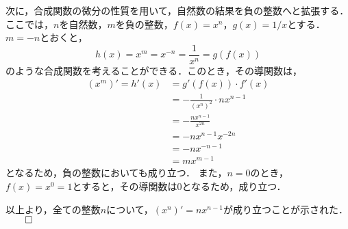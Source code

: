 \begin{Proof}
	次に，合成関数の微分の性質を用いて，自然数の結果を負の整数へと拡張する．
	ここでは，$n$を自然数，$m$を負の整数，$f(x) = x^n$，$g(x)=1/x$とする．
	$m = -n$とおくと，
	\[
		h(x) = x^m = x^{-n} = \frac{1}{x^n} = g\left(f(x)\right)
	\]
	のような合成関数を考えることができる．このとき，その導関数は，
	\begin{align*}
		(x^m)' = h'(x) &= g'\left(f(x)\right)\cdot f'(x) \\
		&= -\frac{1}{\left(x^n\right)^2}\cdot nx^{n-1} \\
		&= -\frac{nx^{n-1}}{x^{2n}} \\
		&= -nx^{n-1}x^{-2n} \\
		&= -nx^{-n-1} \\
		&= mx^{m-1}
	\end{align*}
	となるため，負の整数においても成り立つ．
	また，$n = 0$のとき，$f(x) = x^0 = 1$とすると，その導関数は$0$となるため，成り立つ．
	
	以上より，全ての整数$n$について，$\left(x^n\right)' = nx^{n-1}$が成り立つことが示された．$\qed$
\end{Proof}